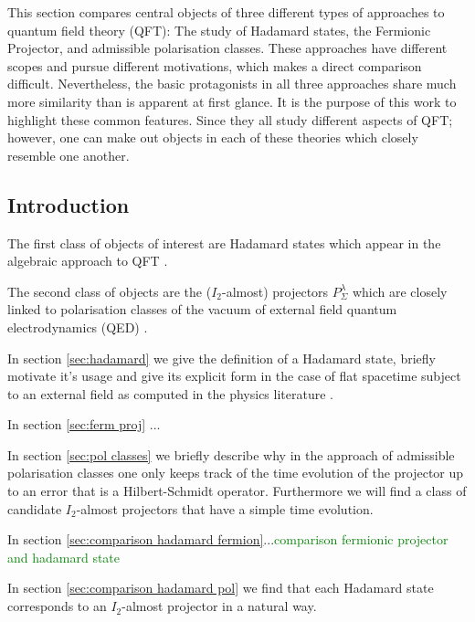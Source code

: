 \documentclass[b5paper,draft,openbib,12pt]{memoir}
\begin{document}
This section compares central objects of three different types of approaches to quantum field theory (QFT): The study of Hadamard states, the
Fermionic Projector, and admissible polarisation classes.
These approaches have different scopes and pursue different motivations, which makes a direct comparison difficult.
Nevertheless, the basic protagonists in all three approaches share much more similarity than is apparent at first glance.
It is the purpose of this work to highlight these common features. 
Since they all study different aspects of QFT; however, one can make out objects in each of these theories which closely resemble
one another. 

\subsection{Introduction}


The first class of objects of interest are Hadamard states which appear in the algebraic approach to 
QFT \cite{fulling1978singularity}. 


The second class of objects are the (\(I_2\)-almost) projectors \(P^\lambda_{\Sigma}\) which are 
closely linked to polarisation classes of the vacuum of external field quantum electrodynamics (QED) \cite{ivp0, ivp1, ivp2}. 


In section \ref{sec:hadamard} we give the definition of a Hadamard state, briefly motivate it's usage 
and give its explicit form in the case of flat spacetime subject to an external field as computed in the physics literature \cite{schlemmer2015current}.

In section \ref{sec:ferm proj} ...

In section \ref{sec:pol classes} we briefly describe why in the approach of admissible polarisation classes one only keeps track of the time
evolution of the projector up to an error that is a Hilbert-Schmidt operator. Furthermore we will find a class of candidate \(I_2\)-almost projectors
that have a simple time evolution.

In section \ref{sec:comparison hadamard fermion}...\textcolor{green}{comparison fermionic projector and hadamard state}

In section \ref{sec:comparison hadamard pol} we find that each Hadamard state corresponds to an \(I_2\)-almost projector in a natural way.
\end{document}
